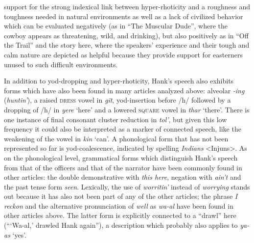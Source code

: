 support for the strong indexical link between hyper-rhoticity and a roughness and toughness needed in natural environments as well as a lack of civilized behavior which can be evaluated negatively (as in “The Muscular Dude”, where the cowboy appears as threatening, wild, and drinking), but also positively as in “Off the Trail” and the story here, where the speakers’ experience and their tough and calm nature are depicted as helpful because they provide support for easterners unused to such difficult environments.

In addition to yod-dropping and hyper-rhoticity, Hank's speech also exhibits forms which have also been found in many articles analyzed above: alveolar \emph{{}-ing} (\emph{huntin’}), a raised \textsc{dress} vowel in \emph{git}, yod-insertion before /h/ followed by a dropping of /h/ in \emph{yere} ‘here’ and a lowered \textsc{square} vowel in \emph{thar} ‘there’. There is one instance of final consonant cluster reduction in \emph{tol’}, but given this low frequency it could also be interpreted as a marker of connected speech, like the weakening of the vowel in \emph{kin} ‘can’. A phonological form that has not been represented so far is yod-coalescence, indicated by spelling \emph{Indians} <Injuns>. As on the phonological level, grammatical forms which distinguish Hank’s speech from that of the officers and that of the narrator have been commonly found in other articles: the double demonstrative with \emph{this here}, negation with \emph{ain’t} and the past tense form\emph{ seen}. Lexically, the use of \emph{worritin’} instead of \emph{worrying} stands out because it has also not been part of any of the other articles; the phrase \emph{I reckon} and the alternative pronunciation of \emph{well} as \emph{wa-al} have been found in other articles above. The latter form is explicitly connected to a “drawl” here (“‘Wa-al,’ drawled Hank again”), a description which probably also applies to \emph{ya-as} ‘yes’.

